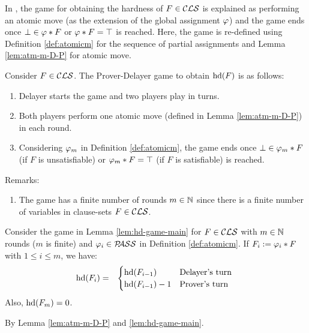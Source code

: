 \documentclass{report}
\begin{document}
In \cite{BeyersdorffKullmann2014PHP}, the game for obtaining the hardness of $F \in \mathcal{CLS}$ is explained as performing an atomic move (as the extension of the global assignment $\varphi$) and the game ends once $\bot \in \varphi * F $ or $\varphi * F=\top$ is reached. Here, the game is re-defined using Definition \ref{def:atomicm} for the sequence of partial assignments and Lemma \ref{lem:atm-m-D-P} for atomic move.

\begin{lem}\label{lem:hd-game-main}
Consider $F \in \mathcal{CLS}$. The Prover-Delayer game to obtain $\operatorname{hd}(F)$ is as follows:
  \begin{enumerate}
  \item Delayer starts the game and two players play in turns.
  \item Both players perform one atomic move (defined in Lemma \ref{lem:atm-m-D-P}) in each round.
  \item Considering $\varphi_m$ in Definition \ref{def:atomicm}, the game ends once $\bot \in \varphi_m * F $ (if $F$ is unsatisfiable) or $\varphi_m * F=\top$ (if $F$ is satisfiable) is reached. 
  \end{enumerate}
\end{lem}
Remarks:
  \begin{enumerate}
  \item The game has a finite number of rounds $m \in \mathbb{N}$ since there is a finite number of variables in clause-sets $F \in \mathcal{CLS}$. 
  \end{enumerate}

\begin{lem}\label{lem:hdchg}
Consider the game in Lemma \ref{lem:hd-game-main} for $F \in \mathcal{CLS}$ with $m \in  \mathbb{N}$ rounds ($m$ is finite) and $\varphi_i \in \mathcal{P\hspace{-0.32em}ASS}$ in Definition \ref{def:atomicm}. If $F_i:= \varphi_i * F$ with $1 \le i \le m$, we have:
  \begin{eqnarray*}
  \operatorname{hd}(F_i) & = &
  \begin{cases}
  \operatorname{hd}(F_{i-1}) & \text{Delayer's turn }\\ \operatorname{hd}(F_{i-1})-1 & \text{Prover's turn}
  \end{cases}
  \end{eqnarray*}
Also, $\operatorname{hd}(F_m)=0$.
\end{lem}
\begin{prf}
By Lemma \ref{lem:atm-m-D-P} and \ref{lem:hd-game-main}.
\end{prf}
\end{document}
